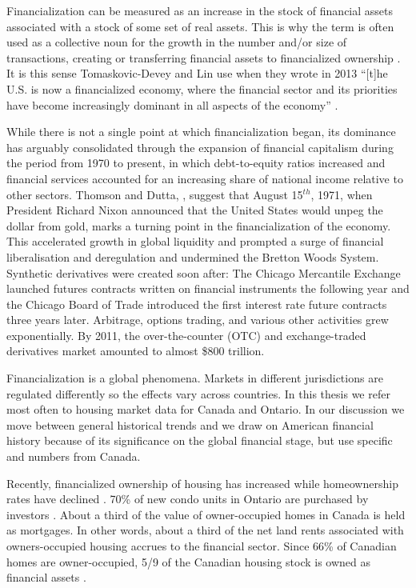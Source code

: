 Financialization can be measured as an increase in the stock of financial assets associated with a stock of some set of real assets. This is why the term is often used as a collective noun for the growth in the number and/or size of  transactions, creating or transferring financial assets to financialized ownership \cite{GET_financialization-numberOfTransactions}. %
It is this sense  Tomaskovic-Devey and Lin use when they wrote in 2013 ``[t]he U.S. is now a financialized economy, where the financial sector and its priorities have become increasingly dominant in all aspects of the economy'' \cite{tomaskovic-deveyFinancializationCausesInequality2013}. 

While there is not a single point at which financialization began, its dominance has arguably consolidated through the expansion of financial capitalism during the period from 1970 to present, in which debt-to-equity ratios increased and financial services accounted for an increasing share of national income relative to other sectors. Thomson and Dutta, \cite{thomsonFinancialisationPrimer2018}, suggest that August 15$^{th}$, 1971, when President Richard Nixon announced that the United States would unpeg the dollar from gold, marks a turning point in the financialization of the economy. This accelerated growth in global liquidity and prompted a surge of financial liberalisation and deregulation and undermined the Bretton Woods System. Synthetic derivatives were created soon after: The Chicago Mercantile Exchange launched futures contracts written on financial instruments the following year and the Chicago Board of Trade introduced the first interest rate future contracts three years later. Arbitrage, options trading, and various other activities grew exponentially. By 2011, the over-the-counter (OTC) and exchange-traded derivatives market amounted to almost \$800 trillion.

Financialization is a global phenomena. Markets in different jurisdictions are regulated differently so the effects vary across countries. In this thesis we refer most often to housing market data for Canada and Ontario. In our discussion we move between general historical trends and we draw on American financial history because of its significance on the global financial stage, but use specific and numbers from Canada. 

Recently, financialized ownership of housing has increased while homeownership rates have declined \cite{statisticscanadaBuyRentHousing2022}.
70\% of new condo units in Ontario are purchased by investors \cite{GET_ontario_condo_ownership}.  About a third of the value of  owner-occupied homes in Canada is held as mortgages. In other words, about a third of the net land rents associated with owners-occupied housing accrues to the financial sector. Since 66\% of Canadian homes are owner-occupied,  5/9 of the Canadian housing stock is owned as financial assets \cite{nemtinFinancializationHousingSocial2021}. %


